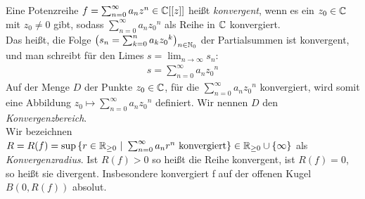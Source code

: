 %
%
\begin{defn}\label{konvergenz}
Eine Potenzreihe $f = \sum_{n= 0}^{\infty}a_nz^n \in \mathbb{C}[[z]]$ heißt \textit{konvergent}, wenn es ein $z_0\in \mathbb{C}$ mit $z_0 \neq 0$ gibt, sodass $\sum_{n=0}^{\infty}a_n{z_0}^n$ als Reihe in $\mathbb{C}$ konvergiert. \\
Das heißt, die Folge $\left(s_n = \sum_{k=0}^{n}a_k{z_0}^k\right)_{n\in\mathbb{N}_0}$ der Partialsummen ist konvergent, und man schreibt für den Limes $s = \lim_{n \to \infty}s_n$:
\begin{align}
s= \sum_{n=0}^{\infty}a_n{z_0}^n
\end{align}
Auf der Menge $D$ der Punkte $z_0 \in \mathbb{C}$, für die $\sum_{n=0}^{\infty}a_n{z_0}^n$ konvergiert, wird somit eine Abbildung $z_0 \mapsto \sum_{n=0}^{\infty}a_n{z_0}^n $ definiert. Wir nennen $D$ den \textit{Konvergenzbereich}. \\
Wir bezeichnen $R = R(f) = \sup{\lbrace r\in \mathbb{R}_{\geq 0} ~|~ \sum_{n=0}^{\infty}a_n{r}^n \text{ konvergiert}\rbrace } \in \mathbb{R}_{\geq 0}\cup \lbrace\infty\rbrace$ als \textit{Konvergenzradius}. Ist $R(f) >0 $ so heißt die Reihe konvergent, ist $R(f)= 0 $, so heißt sie divergent.
Insbesondere konvergiert f auf der offenen Kugel $B(0,R(f))$ absolut.
%
%
\end{defn}


